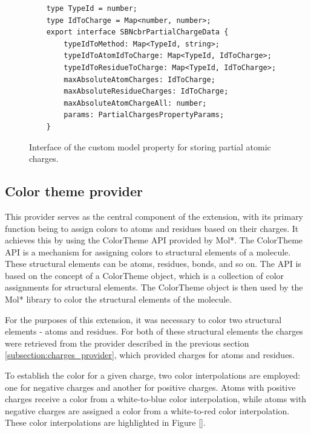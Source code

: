 \documentclass[
  digital,     %
  oneside,     %
  nosansbold,  %
  nocolorbold, %
  lof,         %
  lot,         %
]{fithesis4}
\begin{document}
\begin{figure}[htbp]
  \caption{Interface of the custom model property for storing partial atomic charges.}
  \label{fig:custom_model_property}
  \begin{verbatim}
    type TypeId = number;
    type IdToCharge = Map<number, number>;
    export interface SBNcbrPartialChargeData {
        typeIdToMethod: Map<TypeId, string>;
        typeIdToAtomIdToCharge: Map<TypeId, IdToCharge>;
        typeIdToResidueToCharge: Map<TypeId, IdToCharge>;
        maxAbsoluteAtomCharges: IdToCharge;
        maxAbsoluteResidueCharges: IdToCharge;
        maxAbsoluteAtomChargeAll: number;
        params: PartialChargesPropertyParams;
    }
  \end{verbatim}
\end{figure}

\subsection{Color theme provider}
\label{subsection:color_theme_provider}


This provider serves as the central component of the extension, with its primary function being to assign colors to atoms and residues based on their charges. It achieves this by using the ColorTheme API provided by Mol*. The ColorTheme API is a mechanism for assigning colors to structural elements of a molecule. These structural elements can be atoms, residues, bonds, and so on. The API is based on the concept of a ColorTheme object, which is a collection of color assignments for structural elements. The ColorTheme object is then used by the Mol* library to color the structural elements of the molecule.

For the purposes of this extension, it was necessary to color two structural elements - atoms and residues. For both of these structural elements the charges were retrieved from the provider described in the previous section \ref{subsection:charges_provider}, which provided charges for atoms and residues.

To establish the color for a given charge, two color interpolations are employed: one for negative charges and another for positive charges. Atoms with positive charges receive a color from a white-to-blue color interpolation, while atoms with negative charges are assigned a color from a white-to-red color interpolation. These color interpolations are highlighted in Figure \ref{}. 
\end{document}
